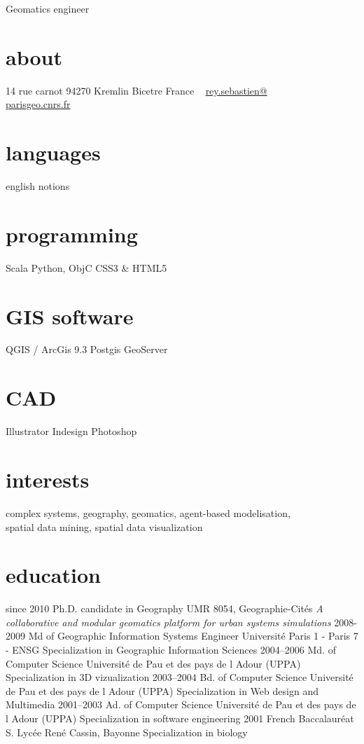 \documentclass[]{friggeri-cv}
\begin{document}
       {Geomatics engineer}

\begin{aside}
  \section{about}
    14 rue carnot
    94270 Kremlin Bicetre
    France
    ~
    \href{mailto:rey.sebastien@parisgeo.cnrs.fr}{rey.sebastien@\\parisgeo.cnrs.fr}
  \section{languages}
    english notions
  \section{programming}
    Scala
    Python, ObjC
    CSS3 \& HTML5
  \section{GIS software}
    QGIS / ArcGis 9.3
    Postgis
    GeoServer
  \section{CAD}
    Illustrator
    Indesign
    Photoshop
\end{aside}

\section{interests}

complex systems, geography, geomatics, agent-based modelisation, \\spatial data mining, spatial data visualization

\section{education}

\begin{entrylist}
  \entry
    {since 2010}
    {Ph.D. {\normalfont candidate in Geography}}
    {UMR 8054, Geographie-Cités}
    {\emph{A collaborative and modular geomatics platform for urban systems simulations}}
  \entry
    {2008-2009}
    {Md of Geographic Information Systems Engineer}
    {Université Paris 1 - Paris 7 - ENSG}
    {Specialization in Geographic Information Sciences}
  \entry
    {2004–2006}
    {Md. of Computer Science}
    {Université de Pau et des pays de l Adour (UPPA)}
    {Specialization in 3D vizualization}
  \entry
    {2003–2004}
    {Bd. of Computer Science}
    {Université de Pau et des pays de l Adour (UPPA)}
    {Specialization in Web design and Multimedia}
  \entry
    {2001–2003}
    {Ad. of Computer Science}
    {Université de Pau et des pays de l Adour (UPPA)}
    {Specialization in software engineering}
  \entry
    {2001}
    {French Baccalauréat S.}
    {Lycée René Cassin, Bayonne}
    {Specialization in biology}
\end{entrylist}
\end{document}
